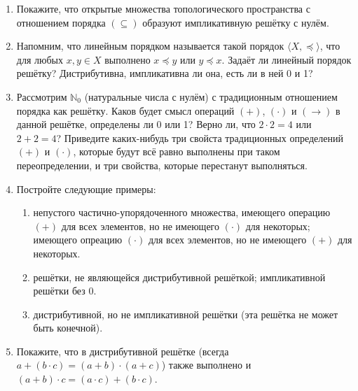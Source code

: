 \documentclass[10pt,a4paper,oneside]{article}
\begin{document}
\begin{enumerate}
\item Покажите, что открытые множества топологического пространства с отношением порядка $(\subseteq)$ 
образуют импликативную решётку с нулём.

\item Напомним, что линейным порядком называется такой порядок $\langle X, \preceq \rangle$, что 
для любых $x,y \in X$ выполнено $x \preceq y$ или $y \preceq x$. Задаёт ли линейный порядок решётку?
Дистрибутивна, импликативна ли она, есть ли в ней 0 и 1?

\item Рассмотрим $\mathbb{N}_0$ (натуральные числа с нулём) с традиционным отношением порядка как решётку.
Каков будет смысл операций $(+)$, $(\cdot)$ и $(\rightarrow)$ в данной решётке, определены ли 0 или 1? 
Верно ли, что $2 \cdot 2 = 4$ или $2 + 2 = 4$? Приведите каких-нибудь три свойста традиционных определений 
$(+)$ и $(\cdot)$, которые будут всё равно выполнены при таком переопределении, и три свойства, которые 
перестанут выполняться.

\item Постройте следующие примеры:
\begin{enumerate}
\item непустого частично-упорядоченного множества, имеющего операцию $(+)$ для всех элементов, но не имеющего $(\cdot)$ для некоторых;
имеющего опреацию $(\cdot)$ для всех элементов, но не имеющего $(+)$ для некоторых.
\item решётки, не являющейся дистрибутивной решёткой; импликативной решётки без 0.
\item дистрибутивной, но не импликативной решётки (эта решётка не может быть конечной).
\end{enumerate}

\item Покажите, что в дистрибутивной решётке (всегда $a + (b \cdot c) = (a + b) \cdot (a + c)$) также выполнено
и $(a + b)\cdot c = (a \cdot c) + (b \cdot c)$.


\end{enumerate}
\end{document}
